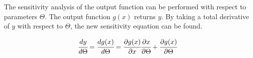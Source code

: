 \documentclass[../Article_Sensitivity_Analsysis.tex]{subfiles}
\begin{document}
	The sensitivity analysis of the output function can be performed with respect to parameters $\Theta$. The output function $g(x)$ returns ${y}$. By taking a total derivative of ${y}$ with respect to $\Theta$, the new sensitivity equation can be found.
	
	{\footnotesize
		\begin{equation}
			\cfrac{d {y}}{d\Theta} = \cfrac{d g(x)}{d\Theta} = \cfrac{\partial g(x)}{\partial x} \cfrac{\partial x}{\partial \Theta} + \cfrac{\partial g(x)}{\partial \Theta}
	   \end{equation} }
	
\end{document}
